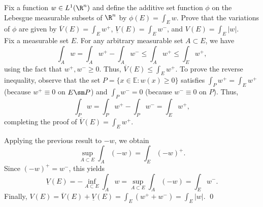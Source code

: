 \begin{hwsol}
Fix a function $w \in L^1(\R^n)$ and define the additive set function $\phi$ on the Lebesgue measurable subsets of $\R^n$ by $\phi(E)= \int_E w$. Prove that the variations of $\phi$ are given by $\overline{V}(E)= \int_E w^+$, $\underline{V}(E)= \int_E w^-$, and $V(E)= \int_E |w|$. \\

\pf Fix a measurable set $E$.  For any arbitrary measurable set $A \subset E$, we have 
        \[
        \int_A w= \int_A w^+ - \int_A w^- \leq \int_A w^+ \leq \int_E w^+,
        \]
using the fact that $w^+, w^-\geq 0$. Thus,  $\overline{V}(E) \leq \int_E w^+$. To prove the reverse inequality, observe that the set $P= \{ x  \in \mathbb{E} \colon w(x) \geq 0 \}$ satisfies $\int_P w^+= \int_E w^+$ (because $w^+\equiv 0$ on $E  \sm P$) and $\int_P w^-= 0$ (because $w^- \equiv 0$ on $P$). Thus,
        \[
        \int_P w= \int_P w^+ - \int_P w^-= \int_E w^+,
        \]
completing the proof of $\overline{V}(E)= \int_E w^+$. 

Applying the previous result to $-w$, we obtain 
        \[
        \sup_{A \subset E} \int_A (-w)= \int_E (-w)^+.
        \]
Since $(-w)^+ = w^-$, this yields
        \[
        \underline{V}(E)= - \inf_{A \subset E} \int_A w= \sup_{A \subset E} \int_A (-w)= \int_E w ^-.
        \]
Finally, $V(E)= \overline{V}(E) + \underline{V}(E) = \int_E (w^+ + w^-)= \int_E |w|$. \qed \\
\end{hwsol}


